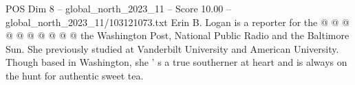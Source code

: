 \begin{textsample}{POS Dim 8 – global\_north\_2023\_11 – Score 10.00 – global\_north\_2023\_11/103121073.txt}
Erin B.
Logan is a reporter for the @ @ @ @ @ @ @ @ @ @ the Washington Post, National Public Radio and the Baltimore Sun.
She previously studied at Vanderbilt University and American University.
Though based in Washington, she ' s a true southerner at heart and is always on the hunt for authentic sweet tea.

\end{textsample}
